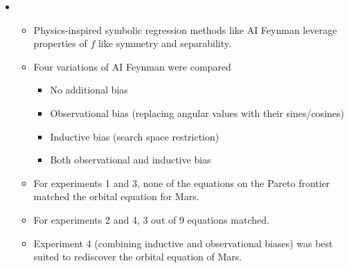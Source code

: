 \documentclass[fleqn,10pt]{olplainarticle}
\begin{document}
\begin{itemize}
    \item {}
          \begin{itemize}
              \item Physics-inspired symbolic regression methods like AI Feynman leverage properties of $f$ like symmetry and separability.
              \item Four variations of AI Feynman were compared
                    \begin{itemize}
                        \item No additional bias
                        \item Observational bias (replacing angular values with their sines/cosines)
                        \item Inductive bias (search space restriction)
                        \item Both observational and inductive bias
                    \end{itemize}
              \item For experiments 1 and 3, none of the equations on the Pareto frontier matched the orbital equation for Mars.
              \item For experiments 2 and 4, 3 out of 9 equations matched.
              \item Experiment 4 (combining inductive and observational biases) was best suited to rediscover the orbital equation of Mars.
          \end{itemize}


\end{itemize}
\end{document}
